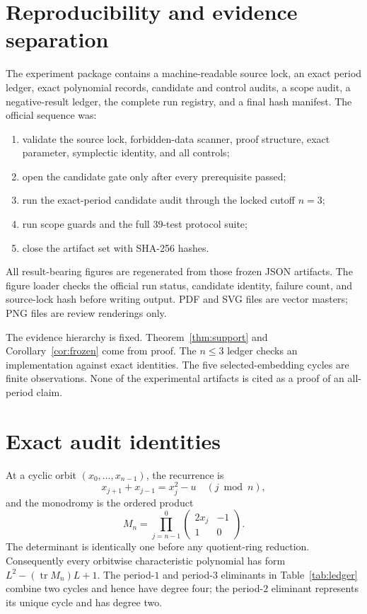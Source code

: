\documentclass[11pt]{article}
\theoremstyle{definition}
\theoremstyle{remark}
\begin{document}
\appendix

\section{Reproducibility and evidence separation}
\label{app:reproducibility}

The experiment package contains a machine-readable source lock, an exact
period ledger, exact polynomial records, candidate and control audits, a scope
audit, a negative-result ledger, the complete run registry, and a final hash
manifest.  The official sequence was:
\begin{enumerate}
  \item validate the source lock, forbidden-data scanner, proof structure,
  exact parameter, symplectic identity, and all controls;
  \item open the candidate gate only after every prerequisite passed;
  \item run the exact-period candidate audit through the locked cutoff
  $n=3$;
  \item run scope guards and the full $39$-test protocol suite;
  \item close the artifact set with SHA-256 hashes.
\end{enumerate}
All result-bearing figures are regenerated from those frozen JSON artifacts.
The figure loader checks the official run status, candidate identity, failure
count, and source-lock hash before writing output.  PDF and SVG files are
vector masters; PNG files are review renderings only.

The evidence hierarchy is fixed.  Theorem~\ref{thm:support} and
Corollary~\ref{cor:frozen} come from proof.  The $n\le3$ ledger checks an
implementation against exact identities.  The five selected-embedding cycles
are finite observations.  None of the experimental artifacts is cited as a
proof of an all-period claim.

\section{Exact audit identities}
\label{app:identities}

At a cyclic orbit $(x_0,\ldots,x_{n-1})$, the recurrence is
\[
 x_{j+1}+x_{j-1}=x_j^2-u
 \quad(j\bmod n),
\]
and the monodromy is the ordered product
\[
 M_n=\prod_{j=n-1}^{0}
 \begin{pmatrix}2x_j&-1\\1&0\end{pmatrix}.
\]
The determinant is identically one before any quotient-ring reduction.
Consequently every orbitwise characteristic polynomial has form
$L^2-(\operatorname{tr}M_n)L+1$.  The period-$1$ and period-$3$ eliminants in
Table~\ref{tab:ledger} combine two cycles and hence have degree four; the
period-$2$ eliminant represents its unique cycle and has degree two.
\end{document}

